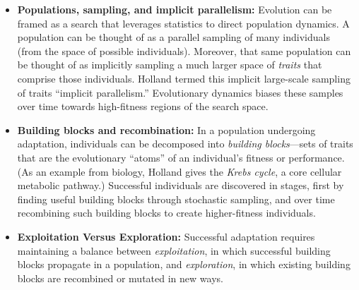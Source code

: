 \documentclass{sig-alternate}
\begin{document}
\begin{itemize}
\item{\bf Populations, sampling, and implicit parallelism:} 
  Evolution can be framed as a search that leverages statistics to
  direct population dynamics.  A population can be thought of as a
  parallel sampling of many individuals (from the space of possible
  individuals).  Moreover, that same population can be thought of as
  implicitly sampling a much larger space of \emph{traits} that
  comprise those individuals.  Holland termed this implicit
  large-scale sampling of traits ``implicit parallelism.''
  Evolutionary dynamics biases these samples over time towards
  high-fitness regions of the search space.

\item{\bf Building blocks and recombination:} 
  In a population undergoing adaptation,
  individuals can be decomposed into \emph{building blocks}---sets of
  traits that are the evolutionary ``atoms'' of an individual's
  fitness or performance. (As an example from biology, Holland gives
  the \emph{Krebs cycle}, a core cellular metabolic
  pathway.)   Successful individuals
  are discovered in stages, first by finding useful
  building blocks through stochastic sampling, and over
  time recombining such building blocks to create higher-fitness individuals. 




\item{\bf Exploitation Versus Exploration:} Successful adaptation
  requires maintaining a balance between \emph{exploitation}, in which
  successful building blocks propagate in a population, and
  \emph{exploration}, in which existing building blocks are recombined
  or mutated in new ways.

\end{itemize} 
\end{document}
